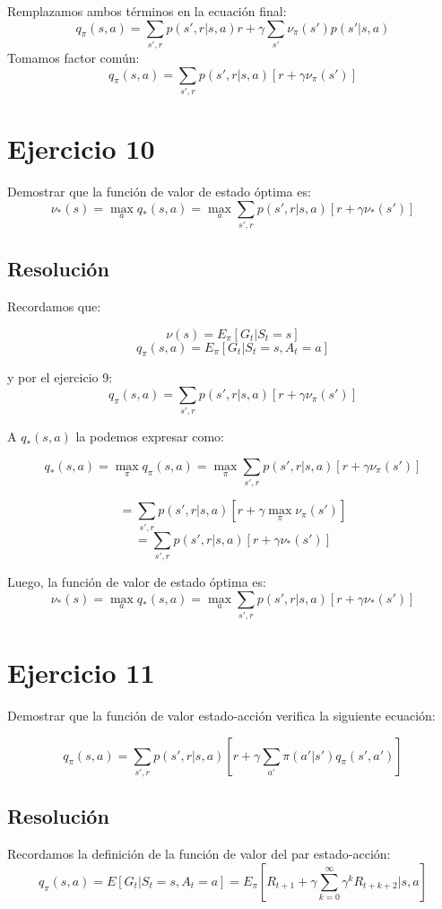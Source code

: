 \documentclass[12pt,a4paper]{article}
\begin{document}
Remplazamos ambos términos en la ecuación final:
$$ q_\pi(s,a) = \sum_{s',r} p(s',r|s,a) r + \gamma \sum_{s'} \nu_\pi(s') p(s'|s,a) $$
Tomamos factor común:
$$ q_\pi(s,a) = \sum_{s',r} p(s',r|s,a) [r + \gamma \nu_\pi(s')] $$

\section{Ejercicio 10}

Demostrar que la función de valor de estado óptima es:
$$ \nu_*(s) = \max_a q_*(s,a) = \max_a \sum_{s',r} p(s',r|s,a)[r + \gamma \nu_*(s')] $$

\subsection{Resolución}

Recordamos que:

$$ \nu(s) = E_\pi[G_t | S_t = s] $$
$$ q_\pi(s,a) = E_\pi[G_t | S_t = s, A_t = a] $$

y por el ejercicio 9:
$$ q_\pi(s,a) = \sum_{s',r} p(s',r|s,a)[r + \gamma \nu_\pi(s')] $$

A $q_*(s,a)$ la podemos expresar como:

$$ q_*(s,a) = \max_\pi q_\pi(s,a) = \max_\pi \sum_{s',r} p(s',r|s,a)[r + \gamma \nu_\pi(s')] $$

$$ = \sum_{s',r} p(s',r|s,a)[r + \gamma \max_\pi \nu_\pi(s')] $$
$$ = \sum_{s',r} p(s',r|s,a)[r + \gamma \nu_*(s')] $$

Luego, la función de valor de estado óptima es:
$$ \nu_*(s) = \max_a q_*(s,a) = \max_a \sum_{s',r} p(s',r|s,a)[r + \gamma \nu_*(s')] $$

\section{Ejercicio 11}

Demostrar que la función de valor estado-acción verifica la siguiente ecuación:

$$ q_\pi(s,a) = \sum_{s',r} p(s',r|s,a)[r + \gamma \sum_{a'} \pi(a'|s') q_\pi(s',a')] $$

\subsection{Resolución}

Recordamos la definición de la función de valor del par estado-acción:
$$ q_\pi(s,a) = E[G_t | S_t = s, A_t = a]  = E_\pi[R_{t+1}+\gamma \sum_{k=0}^{\infty} \gamma^k R_{t+k+2}|s,a]$$
\end{document}
